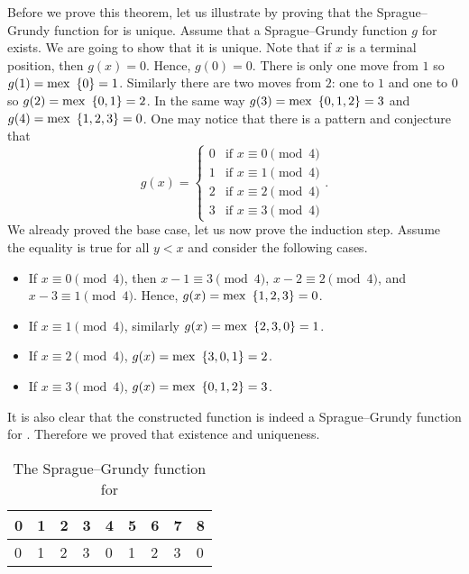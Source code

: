 Before we prove this theorem, let us illustrate by proving that the
Sprague--Grundy function for  is unique.
Assume that a Sprague--Grundy function $g$ for 
exists. We are going to show that it is unique.
Note that if $x$ is a terminal position, then $g(x) = 0$. Hence, $g(0) = 0$.
There is only one move from $1$ so $g(1) = \mex \set{0} = 1$. Similarly
there are two moves from $2$: one to $1$ and one to $0$ so
$g(2) = \mex \set{0, 1} = 2$. In the same way $g(3) = \mex \set{0, 1, 2} = 3$
and $g(4) = \mex \set{1, 2, 3} = 0$.
One may notice that there is a pattern and conjecture that
\[
  g(x) =
  \begin{cases}
      0 & \text{if } x \equiv 0 \pmod{4} \\
      1 & \text{if } x \equiv 1 \pmod{4} \\
      2 & \text{if } x \equiv 2 \pmod{4} \\
      3 & \text{if } x \equiv 3 \pmod{4}
  \end{cases}.
\]
We already proved the base case, let us now prove the induction step.
Assume the equality is true for all $y < x$ and consider the following cases.
\begin{itemize}
    \item If $x \equiv 0 \pmod{4}$, then $x - 1 \equiv 3 \pmod{4}$,
        $x - 2 \equiv 2 \pmod{4}$, and $x - 3 \equiv 1 \pmod{4}$.
        Hence, $g(x) = \mex \set{1, 2, 3} = 0$.
    \item If $x \equiv 1 \pmod{4}$, similarly $g(x) = \mex \set{2, 3, 0} = 1$.
    \item If $x \equiv 2 \pmod{4}$, $g(x) = \mex \set{3, 0, 1} = 2$.
    \item If $x \equiv 3 \pmod{4}$, $g(x) = \mex \set{0, 1, 2} = 3$.
\end{itemize}
It is also clear that the constructed function is indeed a Sprague--Grundy
function for . Therefore we proved that
existence and uniqueness.
\begin{table}
  \centering
  \begin{tabular}{l l l l l l l l l}
      \toprule
      0 & 1 & 2 & 3 & 4 & 5 & 6 & 7 & 8 \\
      \midrule
      0 & 1 & 2 & 3 & 0 & 1 & 2 & 3 & 0 \\
      \bottomrule
  \end{tabular}
  \caption{The Sprague--Grundy function for }
  \label{table:take-away-21-3-2-1-grundy}
  \vskip 10pt
\end{table}

